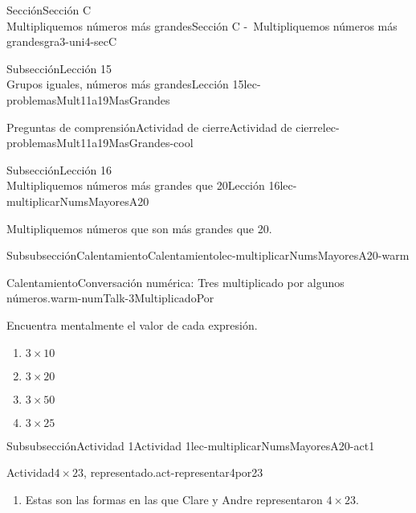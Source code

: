 \begin{sectionptx}{Sección}{{\Large Sección C\\}Multipliquemos números más grandes}{}{Sección C -~Multipliquemos números más grandes}{}{}{gra3-uni4-secC}
\begin{subsectionptx}{Subsección}{{\normalsize Lección 15\\[-0.05cm]}Grupos iguales, números más grandes}{}{Lección 15}{}{}{lec-problemasMult11a19MasGrandes}
\begin{reading-questions-subsubsection}{Preguntas de comprensión}{Actividad de cierre}{}{Actividad de cierre}{}{}{lec-problemasMult11a19MasGrandes-cool}
\end{reading-questions-subsubsection}
\end{subsectionptx}
%
%
\typeout{************************************************}
\typeout{************************************************}
%
\begin{subsectionptx}{Subsección}{{\normalsize Lección 16\\[-0.05cm]}Multipliquemos números más grandes que 20}{}{Lección 16}{}{}{lec-multiplicarNumsMayoresA20}
\begin{introduction}{}%
Multipliquemos números que son más grandes que 20.%
\end{introduction}%
%
%
\typeout{************************************************}
\typeout{************************************************}
%
\begin{subsubsectionptx}{Subsubsección}{Calentamiento}{}{Calentamiento}{}{}{lec-multiplicarNumsMayoresA20-warm}
\begin{exploration}{Calentamiento}{Conversación numérica: Tres multiplicado por algunos números.}{warm-numTalk-3MultiplicadoPor}%
\begin{multicols}{2}
Encuentra mentalmente el valor de cada expresión.%
%
\vfill\columnbreak
\begin{enumerate}[label={\Alph*.}]
\item{}\(\displaystyle 3\times 10\)%
\item{}\(\displaystyle 3\times 20\)%
\item{}\(\displaystyle 3\times 50\)%
\item{}\(\displaystyle 3\times 25\)%
\end{enumerate}
\end{multicols}
\end{exploration}%
\end{subsubsectionptx}
%
%
\typeout{************************************************}
\typeout{************************************************}
%
\begin{subsubsectionptx}{Subsubsección}{Actividad 1}{}{Actividad 1}{}{}{lec-multiplicarNumsMayoresA20-act1}
\begin{activity}{Actividad}{\(4\times 23\), representado.}{act-representar4por23}%
%
\begin{enumerate}
\item{}Estas son las formas en las que Clare y Andre representaron \(4\times 23\).%

\end{enumerate}
\end{activity}
\end{subsubsectionptx}
\end{subsectionptx}
\end{sectionptx}

